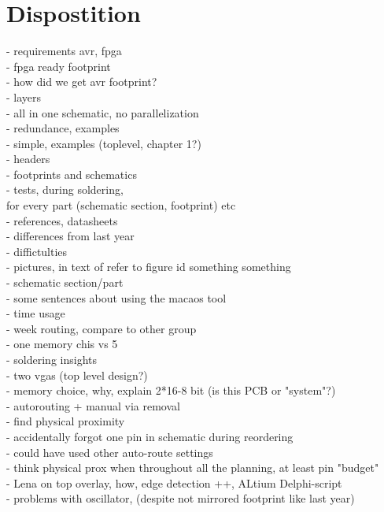 \section {Dispostition}
- requirements avr, fpga \\
- fpga ready footprint \\
- how did we get avr footprint? \\
- layers \\
- all in one schematic, no parallelization \\
- redundance, examples \\
- simple, examples (toplevel, chapter 1?) \\
- headers \\
- footprints and schematics \\
- tests, during soldering, \\

for every part (schematic section, footprint) etc \\
    - references, datasheets \\
    - differences from last year \\
    - diffictulties \\
    - pictures, in text of refer to figure id something something \\
    - schematic section/part \\

    - some sentences about using the macaos tool \\
    - time usage \\
    - week routing, compare to other group \\
    - one memory chis vs 5 \\
    - soldering insights \\
    - two vgas (top level design?) \\
    - memory choice, why, explain 2*16-8 bit (is this PCB or "system"?) \\
    - autorouting + manual via removal \\
    - find physical proximity \\
    - accidentally forgot one pin in schematic during reordering \\
    - could have used other auto-route settings \\
    - think physical prox when throughout all the planning, at least pin "budget" \\
    - Lena on top overlay, how, edge detection ++, ALtium Delphi-script \\
    - problems with oscillator, (despite not mirrored footprint like last year) \\

